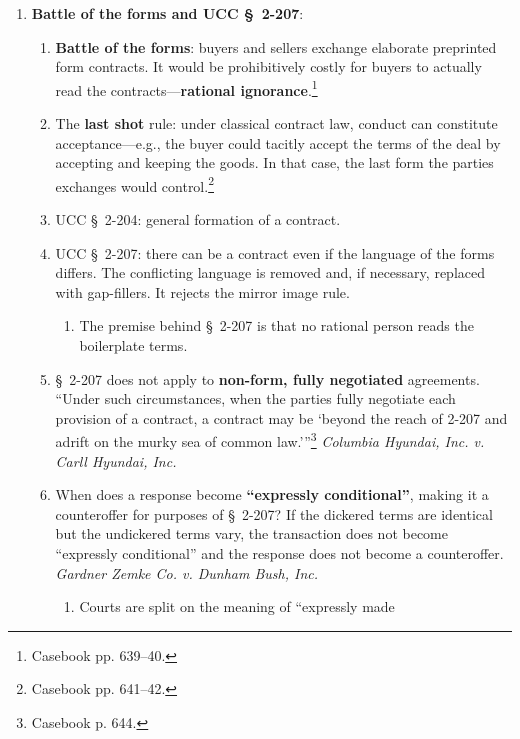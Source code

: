 \begin{enumerate}
    \item \textbf{Battle of the forms and UCC \S\ 2-207}:
    \begin{enumerate}
        \item \textbf{Battle of the forms}: buyers and sellers exchange 
        elaborate preprinted form contracts. It would be prohibitively costly 
        for buyers to actually read the contracts---\textbf{rational 
        ignorance}.\footnote{Casebook pp. 639--40.}
        \item  The \textbf{last shot} rule: under classical contract law, 
        conduct can constitute acceptance---e.g., the buyer could tacitly 
        accept the terms of the deal by accepting and keeping the goods. In 
        that case, the last form the parties exchanges would 
        control.\footnote{Casebook pp.  641--42.}
        \item UCC \S\ 2-204: general formation of a contract.
        \item UCC \S\ 2-207: there can be a contract even if the language of 
        the forms differs. The conflicting language is removed and, if 
        necessary, replaced with gap-fillers. It rejects the mirror image 
        rule.
        \begin{enumerate}
            \item The premise behind \S\ 2-207 is that no rational person 
            reads the boilerplate terms.
        \end{enumerate}
        \item \S\ 2-207 does not apply to \textbf{non-form, fully negotiated} 
        agreements. \enquote{Under such circumstances, when the parties fully 
        negotiate each provision of a contract, a contract may be 
        \enquote{beyond the reach of 2-207 and adrift on the murky sea of 
        common law.}}\footnote{Casebook p. 644.} \emph{Columbia Hyundai, Inc. 
        v. Carll Hyundai, Inc.}
        \item When does a response become \textbf{``expressly conditional''}, 
        making it a counteroffer for purposes of \S\ 2-207? If the dickered 
        terms are identical but the undickered terms vary, the transaction 
        does not become ``expressly conditional'' and the response does not 
        become a counteroffer. \emph{Gardner Zemke Co. v. Dunham Bush, Inc.}
        \begin{enumerate}
            \item Courts are split on the meaning of ``expressly made 

\end{enumerate}
\end{enumerate}
\end{enumerate}
